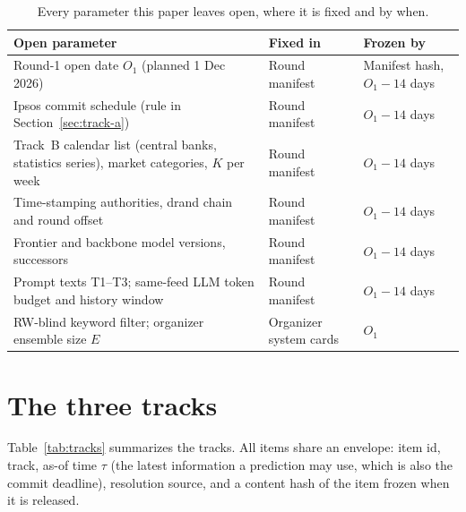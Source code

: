 \documentclass[11pt]{article}
\begin{document}
\begin{table}[t]
\centering
\small
\begin{tabular}{@{}L{6.4cm}L{4.0cm}L{3.6cm}@{}}
\toprule
\textbf{Open parameter} & \textbf{Fixed in} & \textbf{Frozen by} \\
\midrule
Round-1 open date $O_1$ (planned 1 Dec 2026) & Round manifest & Manifest hash, $O_1 - 14$ days \\
Ipsos commit schedule (rule in Section~\ref{sec:track-a}) & Round manifest & $O_1 - 14$ days \\
Track~B calendar list (central banks, statistics series), market categories, $K$ per week & Round manifest & $O_1 - 14$ days \\
Time-stamping authorities, drand chain and round offset & Round manifest & $O_1 - 14$ days \\
Frontier and backbone model versions, successors & Round manifest & $O_1 - 14$ days \\
Prompt texts T1--T3; same-feed LLM token budget and history window & Round manifest & $O_1 - 14$ days \\
RW-blind keyword filter; organizer ensemble size $E$ & Organizer system cards & $O_1$ \\
\bottomrule
\end{tabular}
\caption{Every parameter this paper leaves open, where it is fixed and by when.}
\label{tab:free}
\end{table}

\section{The three tracks}

Table~\ref{tab:tracks} summarizes the tracks. All items share an envelope: item id, track, as-of time $\tau$ (the latest information a prediction may use, which is also the commit deadline), resolution source, and a content hash of the item frozen when it is released.
\end{document}
